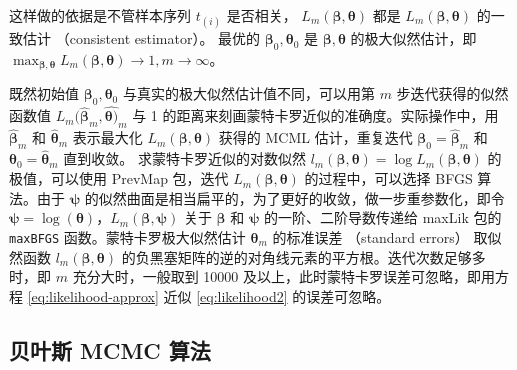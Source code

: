 \documentclass[12pt,a4paper,UTF8,twoside]{book}
\theoremstyle{definition}
\theoremstyle{definition}
\theoremstyle{definition}
\theoremstyle{remark}
\begin{document}
\noindent 这样做的依据是不管样本序列 \(t_{(i)}\) 是否相关，
\(L_{m}(\boldsymbol{\beta},\boldsymbol{\theta})\) 都是
\(L_{m}(\boldsymbol{\beta},\boldsymbol{\theta})\) 的一致估计
（consistent estimator）\citep{PrevMap2017JSS}。 最优的
\(\boldsymbol{\beta}_0,\boldsymbol{\theta}_0\) 是
\(\boldsymbol{\beta},\boldsymbol{\theta}\)
的极大似然估计，即\(\max_{\boldsymbol{\beta},\boldsymbol{\theta}}L_{m}(\boldsymbol{\beta},\boldsymbol{\theta}) \rightarrow 1, m \rightarrow\infty\)。

既然初始值 \(\boldsymbol{\beta}_{0},\boldsymbol{\theta}_{0}\)
与真实的极大似然估计值不同，可以用第 \(m\) 步迭代获得的似然函数值
\(L_{m}(\hat{\boldsymbol{\beta}}_{m}, \hat{\boldsymbol{\theta})}_{m}\)
与 1 的距离来刻画蒙特卡罗近似的准确度。实际操作中，用
\(\hat{\boldsymbol{\beta}}_{m}\) 和 \(\hat{\boldsymbol{\theta}}_{m}\)
表示最大化 \(L_{m}(\boldsymbol{\beta}, \boldsymbol{\theta})\) 获得的
MCML 估计，重复迭代
\(\boldsymbol{\beta}_{0} = \hat{\boldsymbol{\beta}}_{m}\) 和
\(\boldsymbol{\theta}_{0} = \hat{\boldsymbol{\theta}}_{m}\) 直到收敛。
求蒙特卡罗近似的对数似然
\(l_{m}(\boldsymbol{\beta}, \boldsymbol{\theta}) = \log L_{m}(\boldsymbol{\beta}, \boldsymbol{\theta})\)
的极值，可以使用 PrevMap 包，迭代
\(L_{m}(\boldsymbol{\beta}, \boldsymbol{\theta})\) 的过程中，可以选择
BFGS 算法。由于 \(\boldsymbol{\psi}\)
的似然曲面是相当扁平的，为了更好的收敛，做一步重参数化，即令
\(\boldsymbol{\psi} = \log(\boldsymbol{\theta})\)，\(L_{m}(\boldsymbol{\beta}, \boldsymbol{\psi})\)
关于 \(\boldsymbol{\beta}\) 和 \(\boldsymbol{\psi}\)
的一阶、二阶导数传递给 maxLik 包的 \texttt{maxBFGS}
函数。蒙特卡罗极大似然估计 \(\boldsymbol{\theta}_{m}\) 的标准误差
（standard errors） 取似然函数
\(l_{m}(\boldsymbol{\beta},\boldsymbol{\theta})\)
的负黑塞矩阵的逆的对角线元素的平方根。迭代次数足够多时，即 \(m\)
充分大时，一般取到 10000 及以上，此时蒙特卡罗误差可忽略，即用方程
\eqref{eq:likelihood-approx} 近似 \eqref{eq:likelihood2} 的误差可忽略。

\hypertarget{sec:MCMC}{%
\subsection{贝叶斯 MCMC 算法}\label{sec:MCMC}}
\end{document}
